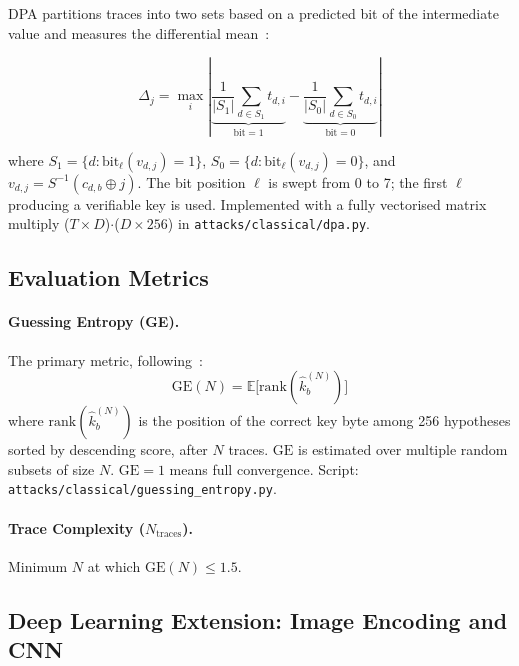 DPA partitions traces into two sets based on a predicted bit of the
intermediate value and measures the differential mean~\cite{kocher1999dpa}:

\begin{equation}
  \Delta_j = \max_i \left|
    \underbrace{\frac{1}{|S_1|}\sum_{d \in S_1} t_{d,i}}_{\text{bit}=1}
    -
    \underbrace{\frac{1}{|S_0|}\sum_{d \in S_0} t_{d,i}}_{\text{bit}=0}
  \right|
  \label{eq:dpa}
\end{equation}

where $S_1 = \{d : \mathrm{bit}_\ell(v_{d,j}) = 1\}$,
$S_0 = \{d : \mathrm{bit}_\ell(v_{d,j}) = 0\}$, and
$v_{d,j} = S^{-1}(c_{d,b} \oplus j)$.
The bit position $\ell$ is swept from 0 to 7; the first $\ell$ producing a
verifiable key is used.
Implemented with a fully vectorised matrix multiply
($T \!\times\! D$)$\cdot$($D\!\times\!256$) in \texttt{attacks/classical/dpa.py}.

\subsection{Evaluation Metrics}
\label{sec:method:metrics}

\paragraph{Guessing Entropy (GE).}
The primary metric, following~\cite{benadjila2020ascad}:
\begin{equation}
  \mathrm{GE}(N) = \mathbb{E}\bigl[\mathrm{rank}(\hat{k}_b^{(N)})\bigr]
  \label{eq:ge}
\end{equation}
where $\mathrm{rank}(\hat{k}_b^{(N)})$ is the position of the correct key
byte among 256 hypotheses sorted by descending score, after $N$ traces.
$\mathrm{GE}$ is estimated over multiple random subsets of size $N$.
$\mathrm{GE} = 1$ means full convergence.
Script: \texttt{attacks/classical/guessing\_entropy.py}.

\paragraph{Trace Complexity ($N_\text{traces}$).}
Minimum $N$ at which $\mathrm{GE}(N) \leq 1.5$.

\subsection{Deep Learning Extension: Image Encoding and CNN}
\label{sec:method:dl}

